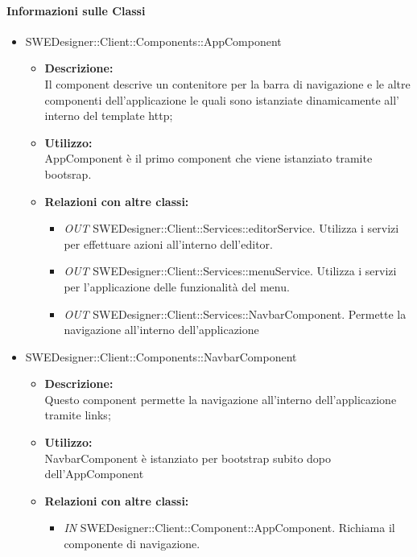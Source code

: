 		\paragraph{Informazioni sulle Classi}
		\begin{itemize}
			\item SWEDesigner::Client::Components::AppComponent
			\begin{itemize}
				\item \textbf{Descrizione: }\\
				Il component descrive un contenitore per la barra di navigazione e le altre
				componenti dell'applicazione le quali sono istanziate dinamicamente all'
				interno del template http;
				\item \textbf{Utilizzo: }\\
				AppComponent è il primo component che viene istanziato tramite bootsrap.
				\item \textbf{Relazioni con altre classi: }\\
				\begin{itemize}
				\item \emph{OUT} SWEDesigner::Client::Services::editorService. Utilizza i servizi per effettuare azioni all'interno dell'editor.
				\item \emph{OUT} SWEDesigner::Client::Services::menuService. Utilizza i servizi per l'applicazione delle funzionalità del menu.
				\item \emph{OUT } SWEDesigner::Client::Services::NavbarComponent. Permette la navigazione all'interno dell'applicazione
				\end{itemize}
			\end{itemize}
			\item SWEDesigner::Client::Components::NavbarComponent
			\begin{itemize}
				\item \textbf{Descrizione: }\\
				Questo component permette la navigazione all'interno dell'applicazione
				tramite links;
				\item \textbf{Utilizzo: }\\
				NavbarComponent è istanziato per bootstrap subito dopo dell'AppComponent
				\item \textbf{Relazioni con altre classi: }
				\begin{itemize}
				\item \emph{IN} SWEDesigner::Client::Component::AppComponent. Richiama il componente di navigazione.
				\end{itemize}
			\end{itemize}
			

\end{itemize}
